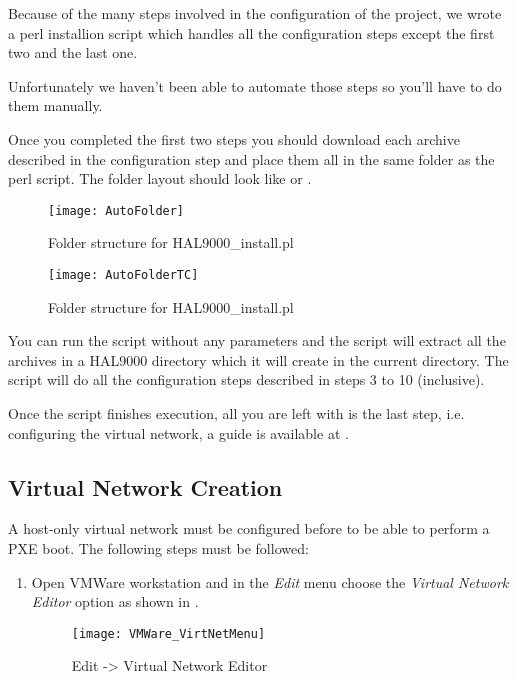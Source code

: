 \begin{appendices}
Because of the many steps involved in the configuration of the project, we wrote a perl installion
script which handles all the configuration steps except the first two and the last one.

Unfortunately we haven't been able to automate those steps so you'll have to do them manually.

Once you completed the first two steps you should download each archive described in the
configuration step and place them all in the same folder as the  perl
script. The folder layout should look like  or .

\begin{figure}
	\centering
	\texttt{[image: AutoFolder]}
		\caption{Folder structure for HAL9000\_install.pl}
	\label{fig:AutoFolder}
\end{figure}

\begin{figure}
	\centering
	\texttt{[image: AutoFolderTC]}
		\caption{Folder structure for HAL9000\_install.pl}
	\label{fig:AutoFolderTC}
\end{figure}

You can run the script without any parameters and the script will extract all the archives in a
HAL9000 directory which it will create in the current directory. The script will do all the
configuration steps described in steps 3 to 10 (inclusive).

Once the script finishes execution, all you are left with is the last step, i.e. configuring the
virtual network, a guide is available at .

\subsection{Virtual Network Creation}
\label{sect:VirtNetwork}

A host-only virtual network must be configured before to be able to perform a PXE boot. The
following steps must be followed:

\begin{enumerate}
	\item Open VMWare workstation and in the \textit{Edit} menu choose the \textit{Virtual Network
Editor} option as shown in .

\begin{figure}
	\centering
	\texttt{[image: VMWare\_VirtNetMenu]}
		\caption{Edit -> Virtual Network Editor}
	\label{fig:VMwareMenu}
\end{figure}


\end{enumerate}
\end{appendices}
